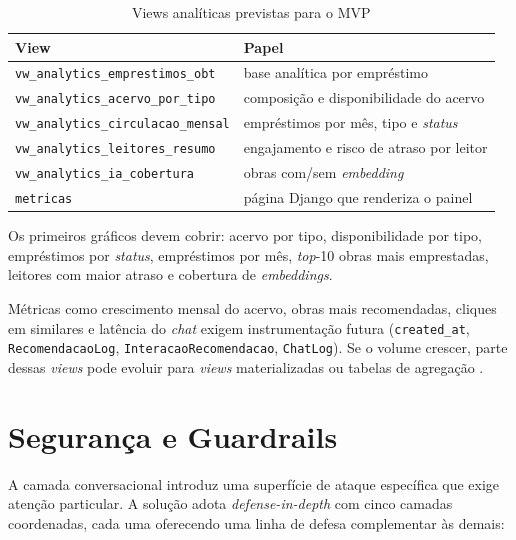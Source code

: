 \documentclass[monografia,abnt]{inf-ufg-modificado}
\begin{document}
\begin{table}[H]
\centering
\caption{Views analíticas previstas para o MVP}
\label{tab:views-analiticas}
\begin{tabular}{@{} l p{8cm} @{}}
\toprule
\textbf{View} & \textbf{Papel} \\
\midrule
\texttt{vw\_analytics\_emprestimos\_obt} & base analítica por empréstimo \\
\texttt{vw\_analytics\_acervo\_por\_tipo} & composição e disponibilidade do acervo \\
\texttt{vw\_analytics\_circulacao\_mensal} & empréstimos por mês, tipo e \textit{status} \\
\texttt{vw\_analytics\_leitores\_resumo} & engajamento e risco de atraso por leitor \\
\texttt{vw\_analytics\_ia\_cobertura} & obras com/sem \textit{embedding} \\
\texttt{metricas} & página Django que renderiza o painel \\
\bottomrule
\end{tabular}
\end{table}

Os primeiros gráficos devem cobrir: acervo por tipo, disponibilidade por tipo, empréstimos por \textit{status}, empréstimos por mês, \textit{top}-10 obras mais emprestadas, leitores com maior atraso e cobertura de \textit{embeddings}.

Métricas como crescimento mensal do acervo, obras mais recomendadas, cliques em similares e latência do \textit{chat} exigem instrumentação futura (\texttt{created\_at}, \texttt{RecomendacaoLog}, \texttt{InteracaoRecomendacao}, \texttt{ChatLog}). Se o volume crescer, parte dessas \textit{views} pode evoluir para \textit{views} materializadas ou tabelas de agregação \cite{postgresql-matview}.

\chapter{Segurança e Guardrails}

A camada conversacional introduz uma superfície de ataque específica que exige atenção particular. A solução adota \textit{defense-in-depth} com cinco camadas coordenadas, cada uma oferecendo uma linha de defesa complementar às demais:
\end{document}
